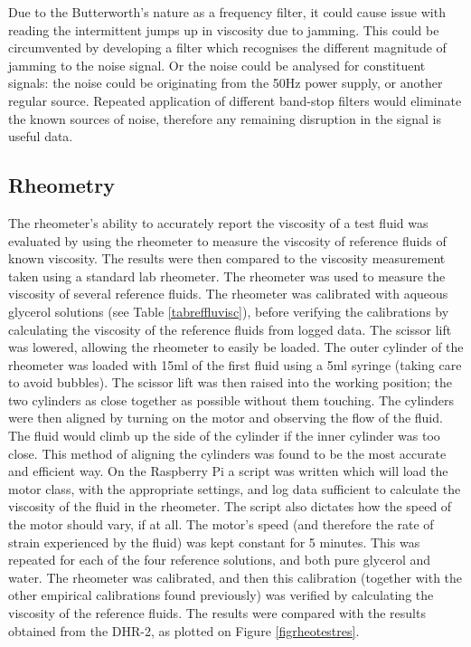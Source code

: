 \documentclass[twoside,a4]{report}
\def\br{\newline \newline \noindent}
\begin{document}
    \noindent
	Due to the Butterworth's nature as a frequency filter, it could cause issue with reading the intermittent jumps up in viscosity due to jamming. This could be circumvented by developing a filter which recognises the different magnitude of jamming to the noise signal. Or the noise could be analysed for constituent signals: the noise could be originating from the 50Hz power supply, or another regular source. Repeated application of different band-stop filters would eliminate the known sources of noise, therefore any remaining disruption in the signal is useful data.

	\subsection*{Rheometry}
	The rheometer's ability to accurately report the viscosity of a test fluid was evaluated by using the rheometer to measure the viscosity of reference fluids of known viscosity. The results were then compared to the viscosity measurement taken using a standard lab rheometer. The rheometer was used to measure the viscosity of several reference fluids. The rheometer was calibrated with aqueous glycerol solutions (see Table \ref{tabreffluvisc}), before verifying the calibrations by calculating the viscosity of the reference fluids from logged data.
	\br
	The scissor lift was lowered, allowing the rheometer to easily be loaded. The outer cylinder of the rheometer was loaded with 15ml of the first fluid using a 5ml syringe (taking care to avoid bubbles). The scissor lift was then raised into the working position; the two cylinders as close together as possible without them touching. The cylinders were then aligned by turning on the motor and observing the flow of the fluid. The fluid would climb up the side of the cylinder if the inner cylinder was too close. This method of aligning the cylinders was found to be the most accurate and efficient way. On the Raspberry Pi a script was written which will load the motor class, with the appropriate settings, and log data sufficient to calculate the viscosity of the fluid in the rheometer. The script also dictates how the speed of the motor should vary, if at all. The motor's speed (and therefore the rate of strain experienced by the fluid) was kept constant for 5 minutes. This was repeated for each of the four reference solutions, and both pure glycerol and water. The rheometer was calibrated, and then this calibration (together with the other empirical calibrations found previously) was verified by calculating the viscosity of the reference fluids. The results were compared with the results obtained from the DHR-2, as plotted on Figure \ref{figrheotestres}.
	
\end{document}
